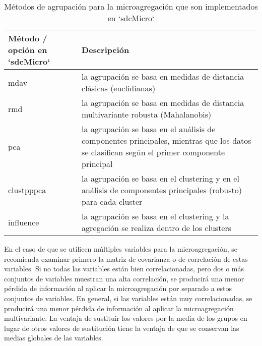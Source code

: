 \documentclass[
]{book}
\theoremstyle{definition}
\theoremstyle{definition}
\theoremstyle{definition}
\theoremstyle{definition}
\theoremstyle{remark}
\begin{document}
\begin{table}

\caption{\label{tab:Tabla18}\label{tab:Tabla18}Métodos de agrupación para la microagregación que son implementados en `sdcMicro`}
\centering
\begin{tabular}[t]{ll}
\toprule
Método / opción en `sdcMicro` & Descripción\\
\midrule
mdav & la agrupación se basa en medidas de distancia clásicas (euclidianas)\\
rmd & la agrupación se basa en medidas de distancia multivariante robusta (Mahalanobis)\\
pca & la agrupación se basa en el análisis de componentes principales, mientras que los datos se clasifican según el primer componente principal\\
clustpppca & la agrupación se basa en el clustering y en el análisis de componentes   principales (robusto) para cada cluster\\
influence & la agrupación se basa en el clustering y la agregación se realiza dentro de los clusters\\
\bottomrule
\end{tabular}
\end{table}

En el caso de que se utilicen múltiples variables para la microagregación, se recomienda examinar primero la matriz de covarianza o de correlación de estas variables. Si no todas las variables están bien correlacionadas, pero dos o más conjuntos de variables muestran una alta correlación, se producirá una menor pérdida de información al aplicar la microagregación por separado a estos conjuntos de variables. En general, si las variables están muy correlacionadas, se producirá una menor pérdida de información al aplicar la microagregación multivariante. La ventaja de sustituir los valores por la media de los grupos en lugar de otros valores de sustitución tiene la ventaja de que se conservan las medias globales de las variables.
\end{document}
